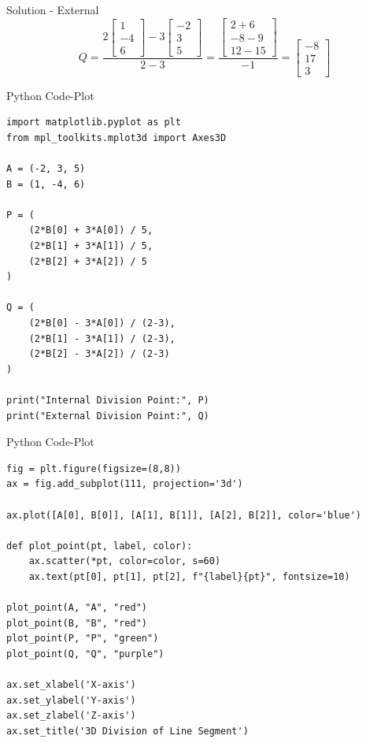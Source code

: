 \documentclass{beamer}
\begin{document}
\begin{frame}{Solution - External}
\[
Q = \frac{2 \begin{bmatrix} 1 \\ -4 \\ 6 \end{bmatrix} - 3 \begin{bmatrix} -2 \\ 3 \\ 5 \end{bmatrix}}{2 - 3}
= \frac{\begin{bmatrix} 2 + 6 \\ -8 - 9 \\ 12 - 15 \end{bmatrix}}{-1}
= \begin{bmatrix} -8 \\ 17 \\ 3 \end{bmatrix}
\]
\end{frame}

\begin{frame}[fragile]{Python Code-Plot}
\begin{verbatim}
import matplotlib.pyplot as plt
from mpl_toolkits.mplot3d import Axes3D

A = (-2, 3, 5)
B = (1, -4, 6)

P = (
    (2*B[0] + 3*A[0]) / 5,
    (2*B[1] + 3*A[1]) / 5,
    (2*B[2] + 3*A[2]) / 5
)

Q = (
    (2*B[0] - 3*A[0]) / (2-3),
    (2*B[1] - 3*A[1]) / (2-3),
    (2*B[2] - 3*A[2]) / (2-3)
)

print("Internal Division Point:", P)
print("External Division Point:", Q)
\end{verbatim}
\end{frame}

\begin{frame}[fragile]{Python Code-Plot}
\begin{verbatim}
fig = plt.figure(figsize=(8,8))
ax = fig.add_subplot(111, projection='3d')

ax.plot([A[0], B[0]], [A[1], B[1]], [A[2], B[2]], color='blue')

def plot_point(pt, label, color):
    ax.scatter(*pt, color=color, s=60)
    ax.text(pt[0], pt[1], pt[2], f"{label}{pt}", fontsize=10)

plot_point(A, "A", "red")
plot_point(B, "B", "red")
plot_point(P, "P", "green")
plot_point(Q, "Q", "purple")

ax.set_xlabel('X-axis')
ax.set_ylabel('Y-axis')
ax.set_zlabel('Z-axis')
ax.set_title('3D Division of Line Segment')


\end{verbatim}
\end{frame}
\end{document}
